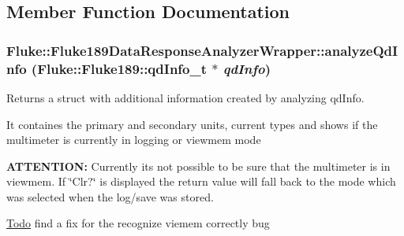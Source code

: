 \subsection{Member Function Documentation}
\hypertarget{classFluke_1_1Fluke189DataResponseAnalyzerWrapper_a2bec1dad601bc993375d358ef77c7e6b}{
\subsubsection[{analyzeQdInfo}]{ Fluke::Fluke189DataResponseAnalyzerWrapper::analyzeQdInfo ({\bf Fluke::Fluke189::qdInfo\_\-t} $\ast$ {\em qdInfo})}}
\label{classFluke_1_1Fluke189DataResponseAnalyzerWrapper_a2bec1dad601bc993375d358ef77c7e6b}
Returns a struct with additional information created by analyzing qdInfo.\par
 It containes the primary and secondary units, current types and shows if the multimeter is currently in logging or viewmem mode\par
 {\bfseries ATTENTION:} Currently its not possible to be sure that the multimeter is in viewmem. If \char`\"{}Clr?\char`\"{} is displayed the return value will fall back to the mode which was selected when the log/save was stored. \begin{Desc}
\item[\hyperlink{todo__todo000022}{Todo}]find a fix for the recognize viemem correctly bug \end{Desc}

